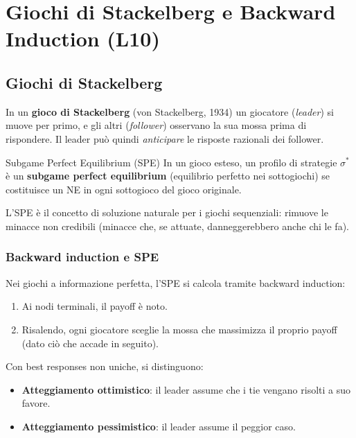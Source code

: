 \documentclass[12pt,a4paper,twoside]{book}
\theoremstyle{plain}
\theoremstyle{definition}
\begin{document}
\chapter{Giochi di Stackelberg e Backward Induction (L10)}
\label{ch:stackelberg}

\section{Giochi di Stackelberg}

In un \textbf{gioco di Stackelberg} (von Stackelberg, 1934) un giocatore (\emph{leader}) si muove per primo, e gli altri (\emph{follower}) osservano la sua mossa prima di rispondere. Il leader può quindi \emph{anticipare} le risposte razionali dei follower.

\begin{defbox}{Subgame Perfect Equilibrium (SPE)}
In un gioco esteso, un profilo di strategie $\sigma^*$ è un \textbf{subgame perfect equilibrium} (equilibrio perfetto nei sottogiochi) se costituisce un NE in ogni sottogioco del gioco originale.
\end{defbox}

L'SPE è il concetto di soluzione naturale per i giochi sequenziali: rimuove le minacce non credibili (minacce che, se attuate, danneggerebbero anche chi le fa).

\subsection{Backward induction e SPE}

Nei giochi a informazione perfetta, l'SPE si calcola tramite backward induction:
\begin{enumerate}
  \item Ai nodi terminali, il payoff è noto.
  \item Risalendo, ogni giocatore sceglie la mossa che massimizza il proprio payoff (dato ciò che accade in seguito).
\end{enumerate}
Con best responses non uniche, si distinguono:
\begin{itemize}
  \item \textbf{Atteggiamento ottimistico}: il leader assume che i tie vengano risolti a suo favore.
  \item \textbf{Atteggiamento pessimistico}: il leader assume il peggior caso.
\end{itemize}
\end{document}
